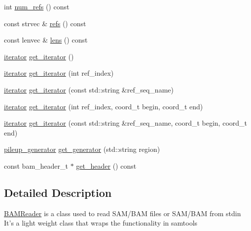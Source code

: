 \begin{DoxyCompactItemize}
\item 
int \hyperlink{class_b_a_m_reader_a0e452e1c6a2058dca0f0e301fa687709}{num\_\-refs} () const 
\item 
const strvec \& \hyperlink{class_b_a_m_reader_ad3d26bd30f9459d57462a1a8a74d87e3}{refs} () const 
\item 
const lenvec \& \hyperlink{class_b_a_m_reader_a2ffe18c4b02e0f4b1eef9342441bf187}{lens} () const 
\item 
\hyperlink{class_b_a_m_reader_1_1iterator}{iterator} \hyperlink{class_b_a_m_reader_a72af082a9d384395f3d9f15a632bda2a}{get\_\-iterator} ()
\item 
\hyperlink{class_b_a_m_reader_1_1iterator}{iterator} \hyperlink{class_b_a_m_reader_a21ef814e5d6cd574607a25344dff8006}{get\_\-iterator} (int ref\_\-index)
\item 
\hyperlink{class_b_a_m_reader_1_1iterator}{iterator} \hyperlink{class_b_a_m_reader_acb2bc246e0bb07f2e325a4a8b3bfa452}{get\_\-iterator} (const std::string \&ref\_\-seq\_\-name)
\item 
\hyperlink{class_b_a_m_reader_1_1iterator}{iterator} \hyperlink{class_b_a_m_reader_a4e5e15cb7d6ace49e542f1e907bd1ff9}{get\_\-iterator} (int ref\_\-index, coord\_\-t begin, coord\_\-t end)
\item 
\hyperlink{class_b_a_m_reader_1_1iterator}{iterator} \hyperlink{class_b_a_m_reader_a9621217637606a2c4c2415ea704eae7a}{get\_\-iterator} (const std::string \&ref\_\-seq\_\-name, coord\_\-t begin, coord\_\-t end)
\item 
\hyperlink{class_b_a_m_reader_1_1pileup__generator}{pileup\_\-generator} \hyperlink{class_b_a_m_reader_a472145007a75d39cd21cc93e660cd4dc}{get\_\-generator} (std::string region)
\item 
const bam\_\-header\_\-t $\ast$ \hyperlink{class_b_a_m_reader_a82bd12d0b5656563a07409a0739bcead}{get\_\-header} () const 
\end{DoxyCompactItemize}


\subsection{Detailed Description}
\hyperlink{class_b_a_m_reader}{BAMReader} is a class used to read SAM/BAM files or SAM/BAM from stdin It's a light weight class that wraps the functionality in samtools 

